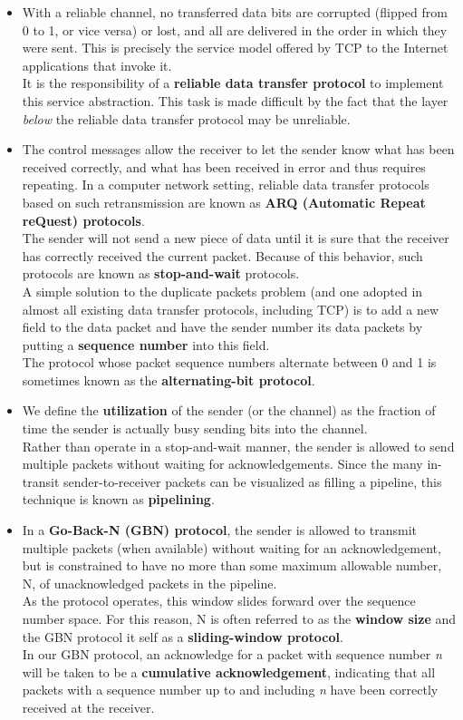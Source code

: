 \begin{itemize}
\item
With a reliable channel, no transferred data bits are corrupted (flipped from 0 to 1, or vice versa) or lost, and all are delivered in the order in which they were sent. This is precisely the service model offered by TCP to the Internet applications that invoke it.\\
It is the responsibility of a \textbf{reliable data transfer protocol} to implement this service abstraction. This task is made difficult by the fact that the layer \textit{below} the reliable data transfer protocol may be unreliable.

\item
The control messages allow the receiver to let the sender know what has been received correctly, and what has been received in error and thus requires repeating. In a computer network setting, reliable data transfer protocols based on such retransmission are known as \textbf{ARQ (Automatic Repeat reQuest) protocols}.\\
The sender will not send a new piece of data until it is sure that the receiver has correctly received the current packet. Because of this behavior, such protocols are known as \textbf{stop-and-wait} protocols.\\
A simple solution to the duplicate packets problem (and one adopted in almost all existing data transfer protocols, including TCP) is to add a new field to the data packet and have the sender number its data packets by putting a \textbf{sequence number} into this field.\\
The protocol whose packet sequence numbers alternate between 0 and 1 is sometimes known as the \textbf{alternating-bit protocol}.

\item
We define the \textbf{utilization} of the sender (or the channel) as the fraction of time the sender is actually busy sending bits into the channel.\\
Rather than operate in a stop-and-wait manner, the sender is allowed to send multiple packets without waiting for acknowledgements. Since the many in-transit sender-to-receiver packets can be visualized as filling a pipeline, this technique is known as \textbf{pipelining}.

\item
In a \textbf{Go-Back-N (GBN) protocol}, the sender is allowed to transmit multiple packets (when available) without waiting for an acknowledgement, but is constrained to have no more than some maximum allowable number, N, of unacknowledged packets in the pipeline.\\
As the protocol operates, this window slides forward over the sequence number space. For this reason, N is often referred to as the \textbf{window size} and the GBN protocol it self as a \textbf{sliding-window protocol}.\\
In our GBN protocol, an acknowledge for a packet with sequence number \textit{n} will be taken to be a \textbf{cumulative acknowledgement}, indicating that all packets with a sequence number up to and including \textit{n} have been correctly received at the receiver.


\end{itemize}
